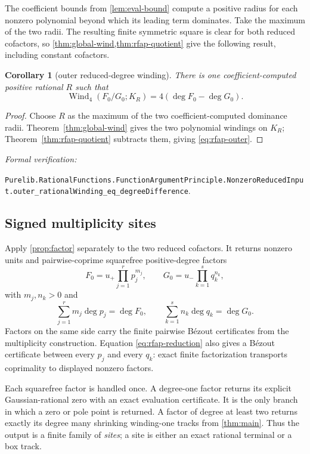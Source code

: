 \documentclass[11pt]{article}
\newtheorem{corollary}[theorem]{Corollary}
\newcommand{\Wind}{\operatorname{Wind}}
\newcommand{\leanref}[1]{\par\smallskip\noindent
  \emph{Formal verification:}\par\nobreak
  {\raggedright\nolinkurl{#1}.\par}}
\begin{document}
The coefficient bounds from \cref{lem:eval-bound} compute a positive radius
for each nonzero polynomial beyond which its leading term dominates.  Take
the maximum of the two radii.  The resulting finite symmetric square is
clear for both reduced cofactors, so \cref{thm:global-wind,thm:rfap-quotient}
give the following result, including constant cofactors.

\begin{corollary}[outer reduced-degree winding]
\label{cor:rfap-outer}
There is one coefficient-computed positive rational $R$ such that
\begin{equation}
\label{eq:rfap-outer}
 \Wind_4(F_0/G_0;K_R)=4(\deg F_0-\deg G_0).
\end{equation}
\end{corollary}

\begin{proof}
Choose $R$ as the maximum of the two coefficient-computed dominance radii.
Theorem~\ref{thm:global-wind} gives the two polynomial windings on $K_R$;
Theorem~\ref{thm:rfap-quotient} subtracts them, giving
\eqref{eq:rfap-outer}.
\end{proof}

\leanref{Purelib.RationalFunctions.FunctionArgumentPrinciple.NonzeroReducedInput.outer_rationalWinding_eq_degreeDifference}

\subsection{Signed multiplicity sites}

Apply \cref{prop:factor} separately to the two reduced cofactors.  It returns
nonzero units and pairwise-coprime squarefree positive-degree factors
\begin{equation}
\label{eq:rfap-weighted-factorization}
 F_0=u_+\prod_{j=1}^{r}p_j^{m_j},\qquad
 G_0=u_-\prod_{k=1}^{s}q_k^{n_k},
\end{equation}
with $m_j,n_k>0$ and
\begin{equation}
\label{eq:rfap-weighted-degrees}
 \sum_{j=1}^{r}m_j\deg p_j=\deg F_0,
 \qquad
 \sum_{k=1}^{s}n_k\deg q_k=\deg G_0.
\end{equation}
Factors on the same side carry the finite pairwise Bézout certificates from
the multiplicity construction.  Equation \eqref{eq:rfap-reduction} also
gives a Bézout certificate between every $p_j$ and every $q_k$: exact finite
factorization transports coprimality to displayed nonzero factors.

Each squarefree factor is handled once.  A degree-one factor returns its
explicit Gaussian-rational zero with an exact evaluation certificate.  It is
the only branch in which a zero or pole point is returned.  A factor of
degree at least two returns exactly its degree many shrinking winding-one
tracks from \cref{thm:main}.  Thus the output is a finite family of
\emph{sites}; a site is either an exact rational terminal or a box track.
\end{document}
